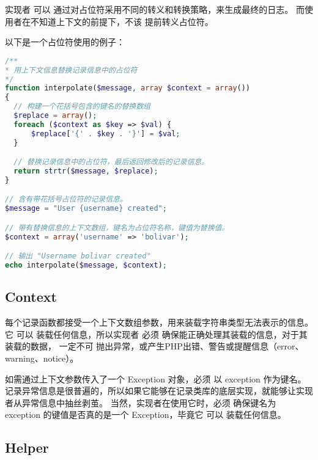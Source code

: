 实现者 可以 通过对占位符采用不同的转义和转换策略，来生成最终的日志。 而使用者在不知道上下文的前提下，不该 提前转义占位符。

以下是一个占位符使用的例子：


\begin{lstlisting}[language=PHP]
/**
* 用上下文信息替换记录信息中的占位符
*/
function interpolate($message, array $context = array())
{
  // 构建一个花括号包含的键名的替换数组
  $replace = array();
  foreach ($context as $key => $val) {
      $replace['{' . $key . '}'] = $val;
  }

  // 替换记录信息中的占位符，最后返回修改后的记录信息。
  return strtr($message, $replace);
}

// 含有带花括号占位符的记录信息。
$message = "User {username} created";

// 带有替换信息的上下文数组，键名为占位符名称，键值为替换值。
$context = array('username' => 'bolivar');

// 输出 "Username bolivar created"
echo interpolate($message, $context);
\end{lstlisting}

\subsection{Context}

\begin{compactitem}
\item 每个记录函数都接受一个上下文数组参数，用来装载字符串类型无法表示的信息。它 可以 装载任何信息，所以实现者 必须 确保能正确处理其装载的信息，对于其装载的数据， 一定不可 抛出异常，或产生PHP出错、警告或提醒信息（error、warning、notice）。

\item 如需通过上下文参数传入了一个 Exception 对象，必须 以 exception 作为键名。 记录异常信息是很普遍的，所以如果它能够在记录类库的底层实现，就能够让实现者从异常信息中抽丝剥茧。 当然，实现者在使用它时，必须 确保键名为 exception 的键值是否真的是一个 Exception，毕竟它 可以 装载任何信息。
\end{compactitem}

\subsection{Helper}

